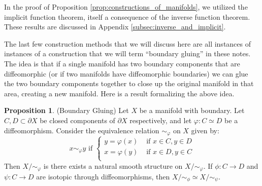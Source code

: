 \documentclass[12pt]{article}
\theoremstyle{definition}
\newtheorem{proposition}[theorem]{Proposition}
\numberwithin{equation}{section}
\begin{document}
In the proof of Proposition \ref{prop:constructions_of_manifolds}, we utilized the implicit function theorem, itself a consequence of the inverse function theorem. These results are discussed in Appendix \ref{subsec:inverse_and_implicit}.

The last few construction methods that we will discuss here are all instances of instances of a construction that we will term ``boundary gluing'' in these notes. The idea is that if a single manifold has two boundary components that are diffeomorphic (or if two manifolds have diffeomorphic boundaries) we can glue the two boundary components together to close up the original manifold in that area, creating a new manifold. Here is a result formalizing the above idea.

\begin{proposition} \label{prop:boundary_gluing} (Boundary Gluing) Let $X$ be a manifold with boundary. Let $C,D \subset \partial X$ be closed components of $\partial X$ respectively, and let $\varphi:C \simeq D$ be a diffeomorphism. Consider the equivalence relation $\sim_\varphi$ on $X$ given by:
\[
x \sim_\varphi y \text{ if }\left\{
\begin{array}{cc}
y = \varphi(x) & \text{ if }x \in C, y \in D\\
x = \varphi(y) & \text{ if }x \in D, y \in C\\
\end{array}\right.
\]
Then $X/\sim_\varphi$ is there exists a natural smooth structure on $X/\sim_\varphi$. If $\phi:C \to D$ and $\psi:C \to D$ are isotopic through diffeomorphisms, then $X/\sim_\phi \simeq X/\sim_\psi$.
\end{proposition}
\end{document}
